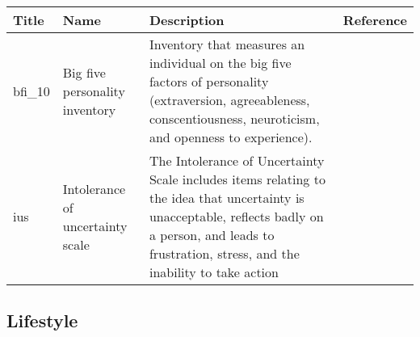 \documentclass[]{book}
\begin{document}
\begin{longtable}[]{@{}llll@{}}
\toprule
\begin{minipage}[b]{0.22\columnwidth}\raggedright
Title\strut
\end{minipage} & \begin{minipage}[b]{0.27\columnwidth}\raggedright
Name\strut
\end{minipage} & \begin{minipage}[b]{0.22\columnwidth}\raggedright
Description\strut
\end{minipage} & \begin{minipage}[b]{0.18\columnwidth}\raggedright
Reference\strut
\end{minipage}\tabularnewline
\midrule
\endhead
\begin{minipage}[t]{0.22\columnwidth}\raggedright
bfi\_10\strut
\end{minipage} & \begin{minipage}[t]{0.27\columnwidth}\raggedright
Big five personality inventory\strut
\end{minipage} & \begin{minipage}[t]{0.22\columnwidth}\raggedright
Inventory that measures an individual on the big five factors of personality (extraversion, agreeableness, conscentiousness, neuroticism, and openness to experience).\strut
\end{minipage} & \begin{minipage}[t]{0.18\columnwidth}\raggedright
\strut
\end{minipage}\tabularnewline
\begin{minipage}[t]{0.22\columnwidth}\raggedright
ius\strut
\end{minipage} & \begin{minipage}[t]{0.27\columnwidth}\raggedright
Intolerance of uncertainty scale\strut
\end{minipage} & \begin{minipage}[t]{0.22\columnwidth}\raggedright
The Intolerance of Uncertainty Scale includes items relating to the idea that uncertainty is unacceptable, reflects badly on a person, and leads to frustration, stress, and the inability to take action\strut
\end{minipage} & \begin{minipage}[t]{0.18\columnwidth}\raggedright
\strut
\end{minipage}\tabularnewline
\bottomrule
\end{longtable}

\hypertarget{lifestyle}{%
\subsection{Lifestyle}\label{lifestyle}}
\end{document}

